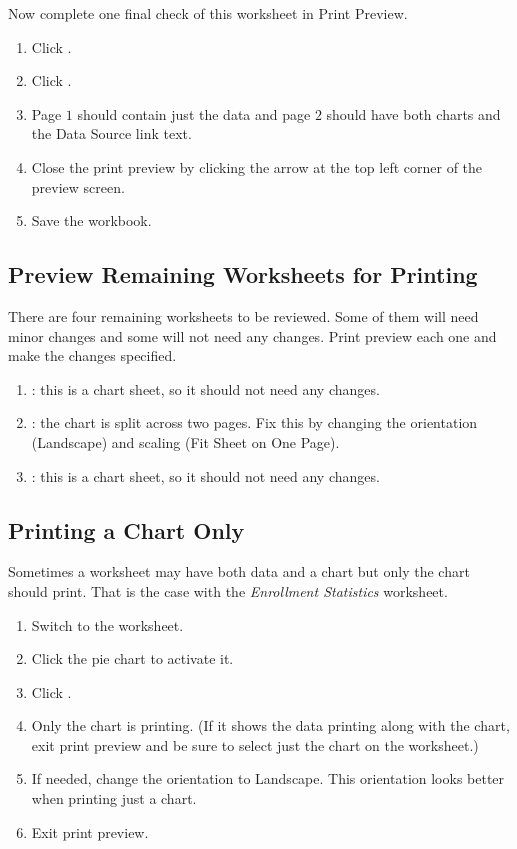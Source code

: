 Now complete one final check of this worksheet in Print Preview.

\begin{enumerate}
	\item Click .
	\item Click .
	\item Page $ 1 $ should contain just the data and page $ 2 $ should have both charts and the Data Source link text.
	\item Close the print preview by clicking the arrow at the top left corner of the preview screen.
	\item Save the workbook.
\end{enumerate}

\subsection{Preview Remaining Worksheets for Printing}

There are four remaining worksheets to be reviewed. Some of them will need minor changes and some will not need any changes. Print preview each one and make the changes specified.

\begin{enumerate}
	\item {}: this is a chart sheet, so it should not need any changes.
	\item {}: the chart is split across two pages. Fix this by changing the orientation (Landscape) and scaling (Fit Sheet on One Page).
	\item {}: this is a chart sheet, so it should not need any changes.
\end{enumerate}

\subsection{Printing a Chart Only}

Sometimes a worksheet may have both data and a chart but only the chart should print. That is the case with the \textit{Enrollment Statistics} worksheet.

\begin{enumerate}
	\item Switch to the  worksheet.
	\item Click the pie chart to activate it.
	\item Click .
	\item Only the chart is printing. (If it shows the data printing along with the chart, exit print preview and be sure to select just the chart on the worksheet.)
	\item If needed, change the orientation to Landscape. This orientation looks better when printing just a chart.
	\item Exit print preview.
\end{enumerate}

